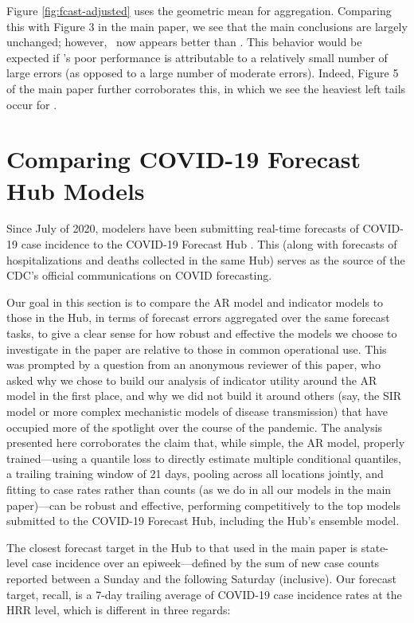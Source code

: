 Figure \ref{fig:fcast-adjusted} uses the geometric mean for aggregation.
Comparing this with Figure 3 in the main paper, we see that the main conclusions
are largely unchanged; however, \chngcli~now appears better than \ar.  This
behavior would be expected if \chngcli's poor performance is attributable to a
relatively small number of large errors (as opposed to a large number of
moderate errors).  Indeed, Figure 5 of the main paper further corroborates this,
in which we see the heaviest left tails occur for \chngcli.

\section{Comparing COVID-19 Forecast Hub Models}

Since July of 2020, modelers have been submitting real-time forecasts of
COVID-19 case incidence to the COVID-19 Forecast Hub \cite{ForecastHub}. This 
(along with forecasts of hospitalizations and deaths collected in the same Hub)
serves as the source of the CDC's official communications on COVID forecasting. 

Our goal in this section is to compare the AR model and indicator models to
those in the Hub, in terms of forecast errors aggregated over the same forecast
tasks, to give a clear sense for how robust and effective the models we choose
to investigate in the paper are relative to those in common operational use.
This was prompted by a question from an anonymous reviewer of this paper, who
asked why we chose to build our analysis of indicator utility around the AR
model in the first place, and why we did not build it around others (say, the
SIR model or more complex mechanistic models of disease transmission) that have 
occupied more of the spotlight over the course of the pandemic.  The analysis
presented here corroborates the claim that, while simple, the AR model, properly
trained---using a quantile loss to directly estimate multiple conditional
quantiles, a trailing training window of 21 days, pooling across all locations
jointly, and fitting to case rates rather than counts (as we do in all our
models in the main paper)---can be robust and effective, performing
competitively to the top models submitted to the COVID-19 Forecast Hub,
including the Hub's ensemble model.

The closest forecast target in the Hub to that used in the main paper is 
state-level case incidence over an epiweek---defined by the sum of new case
counts reported between a Sunday and the following Saturday (inclusive). Our
forecast target, recall, is a 7-day trailing average of COVID-19 case incidence
rates at the HRR level, which is different in three regards:


